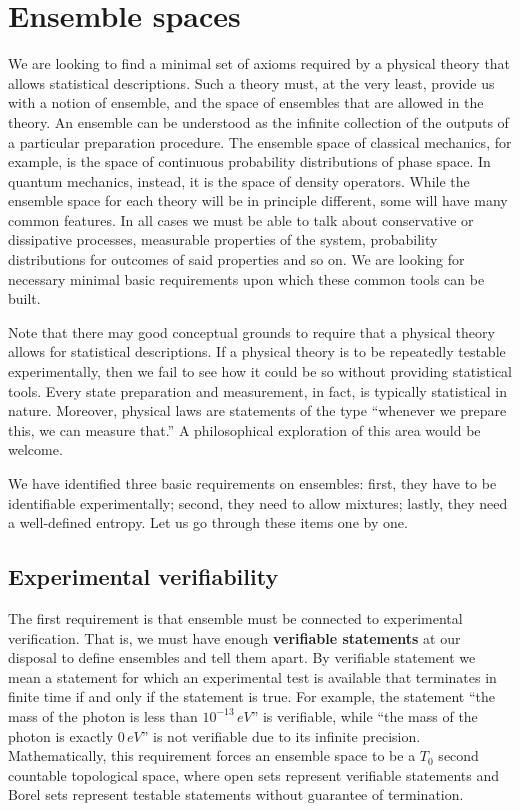\documentclass[10pt,twocolumn, nofootinbib]{revtex4-2}
\begin{document}
\section{Ensemble spaces}

We are looking to find a minimal set of axioms required by a physical theory that allows statistical descriptions. Such a theory must, at the very least, provide us with a notion of ensemble, and the space of ensembles that are allowed in the theory. An ensemble can be understood as the infinite collection of the outputs of a particular preparation procedure. The ensemble space of classical mechanics, for example, is the space of continuous probability distributions of phase space. In quantum mechanics, instead, it is the space of density operators. While the ensemble space for each theory will be in principle different, some will have many common features. In all cases we must be able to talk about conservative or dissipative processes, measurable properties of the system, probability distributions for outcomes of said properties and so on. We are looking for necessary minimal basic requirements upon which these common tools can be built.

Note that there may good conceptual grounds to require that a physical theory allows for statistical descriptions. If a physical theory is to be repeatedly testable experimentally, then we fail to see how it could be so without providing statistical tools. Every state preparation and measurement, in fact, is typically statistical in nature. Moreover, physical laws are statements of the type ``whenever we prepare this, we can measure that.'' A philosophical exploration of this area would be welcome.

We have identified three basic requirements on ensembles: first, they have to be identifiable experimentally; second, they need to allow mixtures; lastly, they need a well-defined entropy. Let us go through these items one by one.

\subsection{Experimental verifiability}
The first requirement is that ensemble must be connected to experimental verification. That is, we must have enough \textbf{verifiable statements} at our disposal to define ensembles and tell them apart. By verifiable statement we mean a statement for which an experimental test is available that terminates in finite time if and only if the statement is true. For example, the statement ``the mass of the photon is less than $10^{-13} \, eV$'' is verifiable, while ``the mass of the photon is exactly $0 \, eV$'' is not verifiable due to its infinite precision. Mathematically, this requirement forces an ensemble space to be a $T_0$ second countable topological space, where open sets represent verifiable statements and Borel sets represent testable statements without guarantee of termination.
\end{document}
